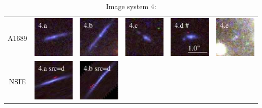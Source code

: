 \documentclass[useAMS,usenatbib]{mn2e}
\begin{document}
\begin{table}
  \caption{Image system 4:}\vspace{0mm}
  \begin{tabular}{cccccc}
    \multicolumn{1}{m{1cm}}{{\Large A1689}}
    & \multicolumn{1}{m{1.7cm}}{\includegraphics[height=2.00cm,clip]{figs/nsie_img/rgb.img_4_a.ps}}
    & \multicolumn{1}{m{1.7cm}}{\includegraphics[height=2.00cm,clip]{figs/nsie_img/rgb.img_4_b.ps}}
    & \multicolumn{1}{m{1.7cm}}{\includegraphics[height=2.00cm,clip]{figs/nsie_img/rgb.img_4_c.ps}}
    & \multicolumn{1}{m{1.7cm}}{\includegraphics[height=2.00cm,clip]{figs/nsie_img/rgb.img_4_d.ps}}
    & \multicolumn{1}{m{1.7cm}}{\includegraphics[height=2.00cm,clip]{figs/nsie_img/rgb.img_4_e.ps}} \\
    \multicolumn{1}{m{1cm}}{{\Large NSIE}}
    & \multicolumn{1}{m{1.7cm}}{\includegraphics[height=2.00cm,clip]{figs/nsie_img/rgb.pre_4_a_d_tri.ps}}
    & \multicolumn{1}{m{1.7cm}}{\includegraphics[height=2.00cm,clip]{figs/nsie_img/rgb.pre_4_b_d_tri.ps}}

\end{tabular}
\end{table}
\end{document}
